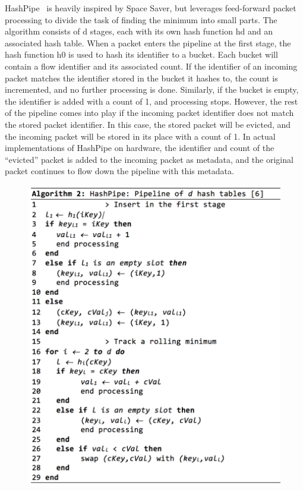 HashPipe~\cite{hashpipe} is heavily inspired by Space Saver, but leverages feed-forward packet processing to divide the task of finding the minimum into small parts. The algorithm consists of d stages, each with its own hash function hd and an associated hash table. When a packet enters the pipeline at the first stage, the hash function h0 is used to hash its identifier to a bucket. Each bucket will contain a flow identifier and its associated count. If the identifier of an incoming packet matches the identifier stored in the bucket it hashes to, the count is incremented, and no further processing is done. Similarly, if the bucket is empty, the identifier is added with a count of 1, and processing stops. However, the rest of the pipeline comes into play if the incoming packet identifier does not match the stored packet identifier. In this case, the stored packet will be evicted, and the incoming packet will be stored in its place with a count of 1. In actual implementations of HashPipe on hardware, the identifier and count of the ``evicted'' packet is added to the incoming packet as metadata, and the original packet continues to flow down the pipeline with this metadata.

\begin{figure}[t]
  \centering
    \includegraphics[scale=0.42]{alg2}
     \label{fig:bp-image}
\end{figure}

